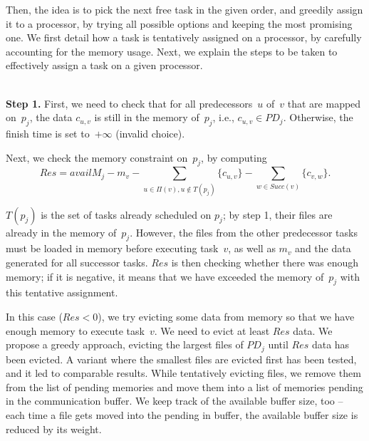 \documentclass[conference]{IEEEtran}
\newcommand{\PD}{PD}
\newcommand{\AB}[1]{{\color{purple}[AB: #1]}}
\begin{document}
\smallskip

    Then, the idea is to pick the next free task in the given order,
    and greedily assign it to a processor, by trying all possible options
    and keeping the most promising one. We first detail how a task
    is tentatively assigned on a processor, by carefully accounting for the memory usage.
    Next, we explain the steps to be taken to effectively assign a task on a given processor.

    \medskip
    \\
    {\bf Step 1.} First, we need to check that for all predecessors~$u$ of~$v$ that are mapped
    on~$p_j$, the data $c_{u,v}$ is still in the memory of~$p_j$,
    i.e., $c_{u,v}\in PD_j$. Otherwise, the finish time is set to~$+\infty$ (invalid choice).

    \smallskip
     Next, we check the memory constraint on~$p_j$, by computing
    $$Res = availM_j - m_v - \!\!\!\! \sum_{u \in \Pi(v), u\notin T(p_j)}  \!\!\!\!\!\!\!\!\{c_{u,v}\}
    - \sum_{w\in Succ(v)} \!\!\!\!\!\! \{c_{v,w}\}.$$

    $T(p_j)$ is the set of tasks already scheduled on $p_j$; by step 1, their files are
    already in the memory of~$p_j$. However, the files from the
    other predecessor tasks must be loaded in memory before executing task~$v$,
    as well as $m_v$ and the data generated for all successor tasks.
    $Res$ is then checking whether there was enough memory; if it is negative,
    it means that we have exceeded the memory of~$p_j$ with this tentative
    assignment.

    In this case ($Res <0$), we try evicting
    some data from memory so that we have enough memory to execute task~$v$.
    We need to evict at least $Res$ data.
    We propose a greedy approach, evicting the largest files of $\PD_j$ until $Res$ data has been evicted. 
    A variant where the smallest files are evicted first has been tested, and it led to comparable results. 
%    
    While tentatively evicting files, we remove them from the list of pending memories and move them into a list
    of memories pending in the communication buffer.
    We keep track of the available buffer size, too -- each time a file gets moved into the pending in buffer, 
    the available buffer size is reduced by its weight.
\end{document}
